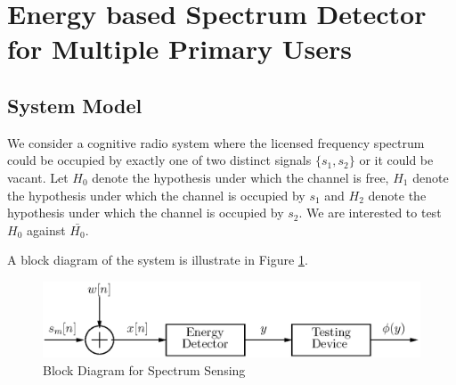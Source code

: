 \section{Energy based Spectrum Detector for Multiple Primary Users}
\subsection{System Model}
We consider a cognitive radio system where the licensed frequency spectrum could be occupied by exactly one of two distinct signals $\{s_1, s_2\}$ or it could be vacant. Let $H_0$ denote the hypothesis under which the channel is free, ${H}_1$ denote the hypothesis under which the channel is occupied by $s_1$ and ${H}_2$ denote the hypothesis under which the channel is occupied by $s_2$. We are interested to test $H_0$ against $\bar{{H}_0}$.

A block diagram of the system is illustrate in Figure \ref{pic: block diagram}.

\begin{figure}[!hbp]
\centering
\includegraphics[width = \textwidth]{4/block_diagram.eps}
\caption{Block Diagram for Spectrum Sensing}
\label{pic: block diagram}
\end{figure}

